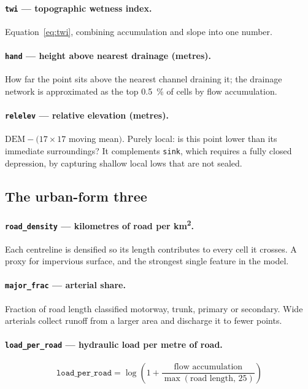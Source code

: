 \documentclass[11pt,a4paper]{article}
\newcommand{\ttt}[1]{\texttt{#1}}
\begin{document}
\paragraph{\ttt{twi} --- topographic wetness index.}
Equation~\eqref{eq:twi}, combining accumulation and slope into one number.

\paragraph{\ttt{hand} --- height above nearest drainage (metres).}
How far the point sits above the nearest channel draining it; the drainage network is
approximated as the top \SI{0.5}{\percent} of cells by flow accumulation.

\paragraph{\ttt{relelev} --- relative elevation (metres).}
$\mathrm{DEM}-(17\times17$ moving mean$)$. Purely local: is this point lower than its
immediate surroundings? It complements \ttt{sink}, which requires a fully closed
depression, by capturing shallow local lows that are not sealed.

\subsection{The urban-form three}

\paragraph{\ttt{road\_density} --- kilometres of road per km\textsuperscript{2}.}
Each centreline is densified so its length contributes to every cell it crosses. A proxy
for impervious surface, and the strongest single feature in the model.

\paragraph{\ttt{major\_frac} --- arterial share.}
Fraction of road length classified motorway, trunk, primary or secondary. Wide arterials
collect runoff from a larger area and discharge it to fewer points.

\paragraph{\ttt{load\_per\_road} --- hydraulic load per metre of road.}
\begin{equation}
\ttt{load\_per\_road} = \log\!\left(1 + \frac{\text{flow accumulation}}
{\max(\text{road length},\,25)}\right)
\end{equation}
\end{document}
